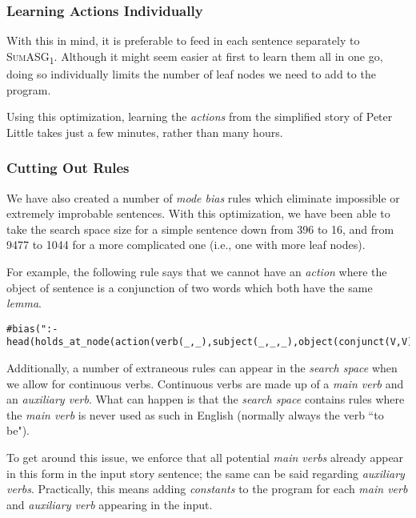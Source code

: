 \subsubsection{Learning Actions Individually}

With this in mind, it is preferable to feed in each sentence separately to \textsc{SumASG\textsubscript{1}}. Although it might seem easier at first to learn them all in one go, doing so individually limits the number of leaf nodes we need to add to the program.

Using this optimization, learning the \textit{actions} from the simplified story of Peter Little takes just a few minutes, rather than many hours.

\subsubsection{Cutting Out Rules}

We have also created a number of \textit{mode bias} rules which eliminate impossible or extremely improbable sentences. With this optimization, we have been able to take the search space size for a simple sentence down from 396 to 16, and from 9477 to 1044 for a more complicated one (i.e., one with more leaf nodes).

For example, the following rule says that we cannot have an \textit{action} where the object of sentence is a conjunction of two words which both have the same \textit{lemma}.

\begin{displayquote}
\begin{lstlisting}[numbers=none]
#bias(":- head(holds_at_node(action(verb(_,_),subject(_,_,_),object(conjunct(V,V),_,_)),var__(1))).").
\end{lstlisting}
\end{displayquote}

Additionally, a number of extraneous rules can appear in the \textit{search space} when we allow for continuous verbs. Continuous verbs are made up of a \textit{main verb} and an \textit{auxiliary verb}. What can happen is that the \textit{search space} contains rules where the \textit{main verb} is never used as such in English (normally always the verb ``to be").

To get around this issue, we enforce that all potential \textit{main verbs} already appear in this form in the input story sentence; the same can be said regarding \textit{auxiliary verbs}. Practically, this means adding \textit{constants} to the program for each \textit{main verb} and \textit{auxiliary verb} appearing in the input.

